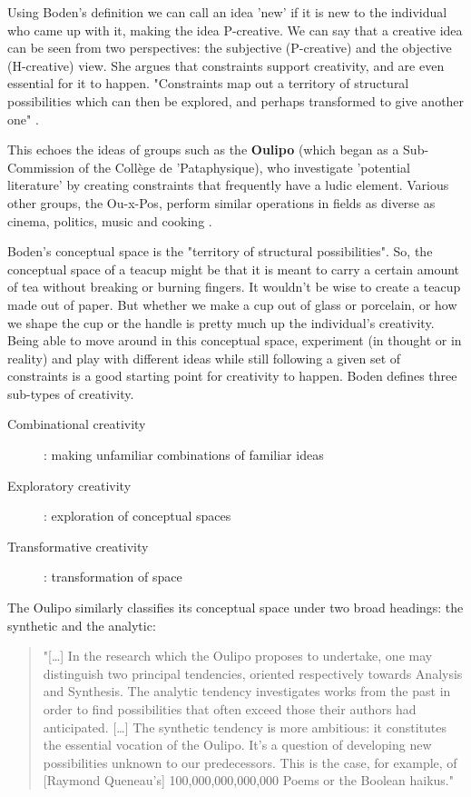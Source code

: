 Using Boden's definition we can call an idea 'new' if it is new to the individual who came up with it, making the idea P-creative. We can say that a creative idea can be seen from two perspectives: the subjective (P-creative) and the objective (H-creative) view. She argues that constraints support creativity, and are even essential for it to happen.  "Constraints map out a territory of structural possibilities which can then be explored, and perhaps transformed to give another one" \citep[p.82]{Boden2003}.

This echoes the ideas of groups such as the \textbf{Oulipo} (which began as a Sub-Commission of the Collège de 'Pataphysique), who investigate 'potential literature' by creating constraints that frequently have a ludic element. Various other groups, the Ou-x-Pos, perform similar operations in fields as diverse as cinema, politics, music and cooking \citep{Motte1998}.

Boden's conceptual space is the "territory of structural possibilities". So, the conceptual space of a teacup might be that it is meant to carry a certain amount of tea without breaking or burning fingers. It wouldn't be wise to create a teacup made out of paper. But whether we make a cup out of glass or porcelain, or how we shape the cup or the handle is pretty much up the individual's creativity. Being able to move around in this conceptual space, experiment (in thought or in reality) and play with different ideas while still following a given set of constraints is a good starting point for creativity to happen. Boden defines three sub-types of creativity.

\begin{description}
\item [Combinational creativity]: making unfamiliar combinations of familiar ideas
\item [Exploratory creativity]: exploration of conceptual spaces
\item [Transformative creativity]: transformation of space
\end{description}

The Oulipo similarly classifies its conceptual space under two broad headings: the synthetic and the analytic:

\begin{quote}
"[…] In the research which the Oulipo proposes to undertake, one may distinguish two principal tendencies, oriented respectively towards Analysis and Synthesis. The analytic tendency investigates works from the past in order to find possibilities that often exceed those their authors had anticipated. […] The synthetic tendency is more ambitious: it constitutes the essential vocation of the Oulipo. It's a question of developing new possibilities unknown to our predecessors. This is the case, for example, of [Raymond Queneau's] 100,000,000,000,000 Poems or the Boolean haikus." \citep[p.27]{Motte1998}
\end{quote}

